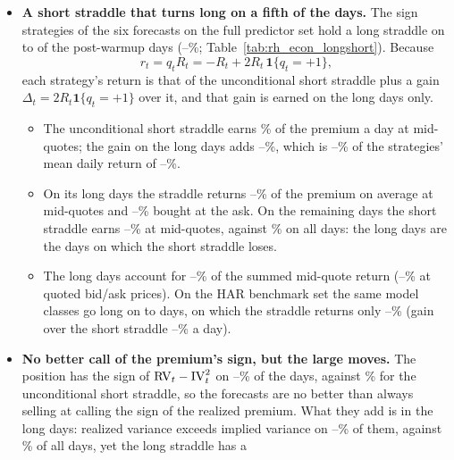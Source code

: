 \begin{itemize}
\item \textbf{A short straddle that turns long on a fifth of the days.} The sign strategies of the six
  forecasts on the full predictor set hold a long straddle on \rhedLongNMin{} to \rhedLongNMax{} of the \rheSzDays{}
  post-warmup days (\rhedLongPctMin--\rhedLongPctMax\%; Table~\ref{tab:rh_econ_longshort}). Because
  \[
    r_t = q_t R_t = -R_t + 2R_t\,\mathbf{1}\{q_t = +1\},
  \]
  each strategy's return is that of the unconditional short straddle plus a gain $\Delta_t = 2R_t\mathbf{1}\{q_t = +1\}$
  over it, and that gain is earned on the long days only.
  \begin{itemize}
  \item The unconditional short straddle earns \rhedUncShortMean\% of the premium a day at mid-quotes; the gain on the
    long days adds \rhedGainMin--\rhedGainMax\%, which is \rhedGainShareMin--\rhedGainShareMax\% of the strategies'
    mean daily return of \rhedMeanMin--\rhedMeanMax\%.
  \item On its long days the straddle returns \rhedLongMidMin--\rhedLongMidMax\% of the premium on average at
    mid-quotes and \rhedLongBaMin--\rhedLongBaMax\% bought at the ask. On the remaining days the short straddle earns
    \rhedShortMidMin--\rhedShortMidMax\% at mid-quotes, against \rhedUncShortMean\% on all days: the long days are the
    days on which the short straddle loses.
  \item The long days account for \rhedLongShareMin--\rhedLongShareMax\% of the summed mid-quote return
    (\rhedLongShareXMin--\rhedLongShareXMax\% at quoted bid/ask prices). On the HAR benchmark set the same model
    classes go long on \rhedHarLongNMin{} to \rhedHarLongNMax{} days, on which the straddle returns only
    \rhedHarLongMidMin--\rhedHarLongMidMax\% (gain over the short straddle \rhedHarGainMin--\rhedHarGainMax\% a day).
  \end{itemize}
\item \textbf{No better call of the premium's sign, but the large moves.} The position has the sign of
  $\mathrm{RV}_t - \mathrm{IV}_t^2$ on \rhedHitMin--\rhedHitMax\% of the days, against \rhedUncShortHit\% for the
  unconditional short straddle, so the forecasts are no better than always selling at calling the sign of the
  realized premium. What they add is in the long days: realized variance exceeds implied variance on
  \rhedLongHitMin--\rhedLongHitMax\% of them, against \rhedUncRVAboveIV\% of all days, yet the long straddle has a

\end{itemize}
